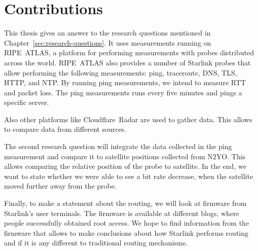 \section{Contributions} \label{sec:contributions}

This thesis gives an answer to the research questions mentioned in Chapter~\ref{sec:research-questions}.
It uses measurements running on RIPE~ATLAS, a platform for performing measurements with probes distributed across the world.
RIPE~ATLAS also provides a number of Starlink probes that allow performing the following measurements: ping, traceroute, DNS, TLS, HTTP, and NTP.
By running ping measurements, we intend to measure \ac{RTT} and packet loss. The ping measurements runs every five minutes and pings a specific server.

Also other platforms like Cloudflare~Radar are used to gather data. This allows to compare data from different sources.

The second research question will integrate the data collected in the ping measurement and compare it to satellite positions collected from N2YO. This allows comparing the relative position of the probe to satellite.
In the end, we want to state whether we were able to see a bit rate decrease, when the satellite moved further away from the probe.

Finally, to make a statement about the routing, we will look at firmware from Starlink's user terminals. The firmware is available at different blogs, where people successfully obtained root access.
We hope to find information from the firmware that allows to make conclusions about how Starlink performs routing and if it is any different to traditional routing mechanisms.
